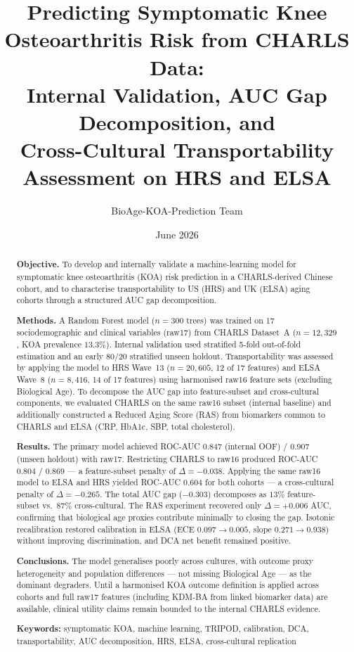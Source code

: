 \documentclass[11pt,a4paper]{article}
\title{Predicting Symptomatic Knee Osteoarthritis Risk from CHARLS Data:\\
\large Internal Validation, AUC Gap Decomposition, and\\
Cross-Cultural Transportability Assessment on HRS and ELSA}
\author{BioAge-KOA-Prediction Team}
\date{June 2026}
\begin{document}
\maketitle

\begin{abstract}
\textbf{Objective.} To develop and internally validate a machine-learning model for
symptomatic knee osteoarthritis (KOA) risk prediction in a CHARLS-derived Chinese cohort,
and to characterise transportability to US (HRS) and UK (ELSA) aging cohorts through a
structured AUC gap decomposition.

\textbf{Methods.} A Random Forest model ($n=300$ trees) was trained on 17
sociodemographic and clinical variables (raw17) from CHARLS Dataset~A
($n=12{,}329$, KOA prevalence $13.3\%$). Internal validation used stratified 5-fold
out-of-fold estimation and an early 80/20 stratified unseen holdout. Transportability was
assessed by applying the model to HRS Wave~13 ($n=20{,}605$, 12 of 17 features) and ELSA
Wave~8 ($n=8{,}416$, 14 of 17 features) using harmonised raw16 feature sets (excluding
Biological Age). To decompose the AUC gap into feature-subset and cross-cultural
components, we evaluated CHARLS on the same raw16 subset (internal baseline) and
additionally constructed a Reduced Aging Score (RAS) from biomarkers common to CHARLS
and ELSA (CRP, HbA1c, SBP, total cholesterol).

\textbf{Results.} The primary model achieved ROC-AUC $0.847$ (internal OOF) / $0.907$
(unseen holdout) with raw17. Restricting CHARLS to raw16 produced ROC-AUC $0.804$ /
$0.869$ — a feature-subset penalty of $\Delta=-0.038$. Applying the same raw16 model to
ELSA and HRS yielded ROC-AUC $0.604$ for both cohorts — a cross-cultural penalty of
$\Delta=-0.265$. The total AUC gap ($-0.303$) decomposes as $13\%$ feature-subset vs.\
$87\%$ cross-cultural. The RAS experiment recovered only $\Delta=+0.006$ AUC,
confirming that biological age proxies contribute minimally to closing the gap.
Isotonic recalibration restored calibration in ELSA (ECE $0.097 \rightarrow 0.005$,
slope $0.271 \rightarrow 0.938$) without improving discrimination, and DCA net benefit
remained positive.

\textbf{Conclusions.} The model generalises poorly across cultures, with outcome proxy
heterogeneity and population differences — not missing Biological Age — as the dominant
degraders. Until a harmonised KOA outcome definition is applied across cohorts and full
raw17 features (including KDM-BA from linked biomarker data) are available, clinical
utility claims remain bounded to the internal CHARLS evidence.

\textbf{Keywords:} symptomatic KOA, machine learning, TRIPOD, calibration, DCA,
transportability, AUC decomposition, HRS, ELSA, cross-cultural replication
\end{abstract}
\end{document}
